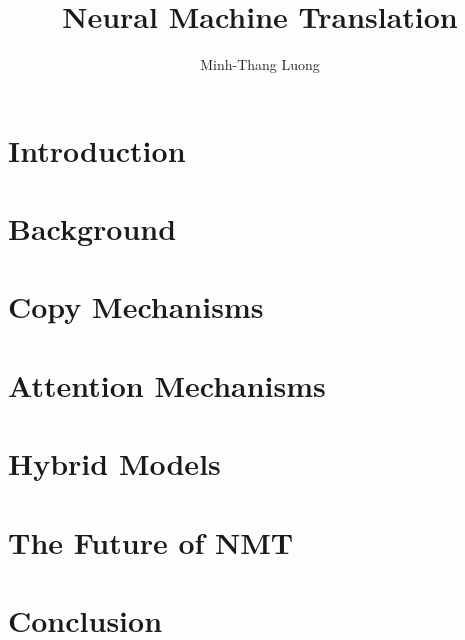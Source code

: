 \documentclass[12pt]{report}
\begin{document}
\title{Neural Machine Translation}
\author{Minh-Thang Luong}

\beforepreface


\afterpreface


\chapter{Introduction}
\label{c:intro}


\chapter{Background}
\label{c:background}


\chapter{Copy Mechanisms}
\label{c:copy}


\chapter{Attention Mechanisms}
\label{c:attention}


\chapter{Hybrid Models}
\label{c:hybrid}


\chapter{The Future of NMT}
\label{c:future}


\chapter{Conclusion}
\label{c:conclude}





\end{document}

